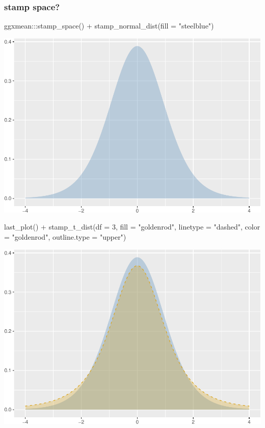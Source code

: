\documentclass[12pt]{article}
\newenvironment{Shaded}{\begin{snugshade}}{\end{snugshade}}
\newcommand{\AttributeTok}[1]{\textcolor[rgb]{0.77,0.63,0.00}{#1}}
\newcommand{\DecValTok}[1]{\textcolor[rgb]{0.00,0.00,0.81}{#1}}
\newcommand{\FunctionTok}[1]{\textcolor[rgb]{0.00,0.00,0.00}{#1}}
\newcommand{\NormalTok}[1]{#1}
\newcommand{\SpecialCharTok}[1]{\textcolor[rgb]{0.00,0.00,0.00}{#1}}
\newcommand{\StringTok}[1]{\textcolor[rgb]{0.31,0.60,0.02}{#1}}
\begin{document}
\hypertarget{stamp-space}{%
\subsubsection{stamp space?}\label{stamp-space}}

\begin{Shaded}
\begin{Highlighting}[]
\NormalTok{ggxmean}\SpecialCharTok{:::}\FunctionTok{stamp\_space}\NormalTok{() }\SpecialCharTok{+}
  \FunctionTok{stamp\_normal\_dist}\NormalTok{(}\AttributeTok{fill =} \StringTok{"steelblue"}\NormalTok{)}
\end{Highlighting}
\end{Shaded}

\begin{center}\includegraphics[width=0.5\linewidth]{manuscript_files/figure-latex/unnamed-chunk-11-1} \end{center}

\begin{Shaded}
\begin{Highlighting}[]
\FunctionTok{last\_plot}\NormalTok{() }\SpecialCharTok{+}
  \FunctionTok{stamp\_t\_dist}\NormalTok{(}\AttributeTok{df =} \DecValTok{3}\NormalTok{, }
               \AttributeTok{fill =} \StringTok{"goldenrod"}\NormalTok{,}
               \AttributeTok{linetype =} \StringTok{"dashed"}\NormalTok{,}
               \AttributeTok{color =} \StringTok{"goldenrod"}\NormalTok{,}
               \AttributeTok{outline.type =} \StringTok{"upper"}\NormalTok{)}
\end{Highlighting}
\end{Shaded}

\begin{center}\includegraphics[width=0.5\linewidth]{manuscript_files/figure-latex/unnamed-chunk-11-2} \end{center}
\end{document}
